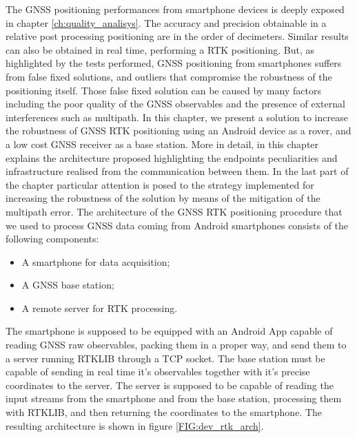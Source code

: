 The GNSS positioning performances from smartphone devices is deeply exposed in chapter \ref{ch:quality_analisys}. The accuracy and precision obtainable in a relative post processing positioning are in the order of decimeters. Similar results can also be  obtained in real time, performing a RTK positioning. But, as highlighted by the tests performed, GNSS positioning from smartphones suffers from false fixed solutions, and outliers that compromise the robustness of the positioning itself. Those false fixed solution can be caused by many factors including the poor quality of the GNSS observables and the presence of external interferences such as multipath.
In this chapter, we present a solution to increase the robustness of GNSS RTK positioning using an Android device as a rover, and a low cost GNSS receiver as a base station. More in detail, in this chapter explains the architecture proposed highlighting the endpoints peculiarities and infrastructure realised from the communication between them. In the last part of the chapter particular attention is posed to the strategy implemented for increasing the robustness of the solution by means of the mitigation of the multipath error.
%
The architecture of the GNSS RTK positioning procedure that we used to process GNSS data coming from Android smartphones consists of the following components:
\begin{itemize}
\item A smartphone for data acquisition;
\item A GNSS base station; 
\item A remote server for RTK processing.
\end{itemize}
The smartphone is supposed to be equipped with an Android App capable of reading GNSS raw observables, packing them in a proper way, and send them to a server running RTKLIB through a TCP socket. The base station must be capable of sending in real time it's observables together with it's precise coordinates to the server. The server is supposed to be capable of reading the input streams from the smartphone and from the base station, processing them with RTKLIB, and then returning the coordinates to the smartphone. 
The resulting architecture is shown in figure \ref{FIG:dev_rtk_arch}.
